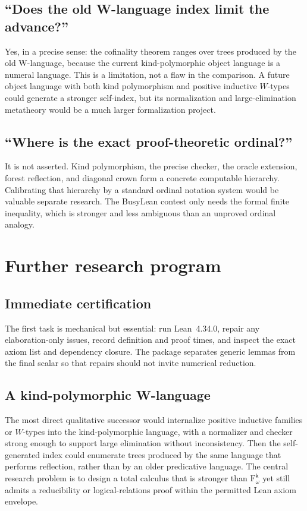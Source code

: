 \documentclass[11pt]{article}
\theoremstyle{definition}
\theoremstyle{remark}
\newcommand{\Fk}{\mathrm{F}_{\omega}^{\mathsf{k}}}
\begin{document}
\subsection{``Does the old W-language index limit the advance?''}

Yes, in a precise sense: the cofinality theorem ranges over trees produced by
the old W-language, because the current kind-polymorphic object language is a
numeral language.  This is a limitation, not a flaw in the comparison.  A
future object language with both kind polymorphism and positive inductive
$W$-types could generate a stronger self-index, but its normalization and
large-elimination metatheory would be a much larger formalization project.

\subsection{``Where is the exact proof-theoretic ordinal?''}

It is not asserted.  Kind polymorphism, the precise checker, the oracle
extension, forest reflection, and diagonal crown form a concrete computable
hierarchy.  Calibrating that hierarchy by a standard ordinal notation system
would be valuable separate research.  The BusyLean contest only needs the
formal finite inequality, which is stronger and less ambiguous than an
unproved ordinal analogy.

\section{Further research program}

\subsection{Immediate certification}

The first task is mechanical but essential: run Lean~4.34.0, repair any
elaboration-only issues, record definition and proof times, and inspect the
exact axiom list and dependency closure.  The package separates generic lemmas
from the final scalar so that repairs should not invite numerical reduction.

\subsection{A kind-polymorphic W-language}

The most direct qualitative successor would internalize positive inductive
families or $W$-types into the kind-polymorphic language, with a normalizer and
checker strong enough to support large elimination without inconsistency.
Then the self-generated index could enumerate trees produced by the same
language that performs reflection, rather than by an older predicative
language.  The central research problem is to design a total calculus that is
stronger than $\Fk$ yet still admits a reducibility or logical-relations proof
within the permitted Lean axiom envelope.
\end{document}
